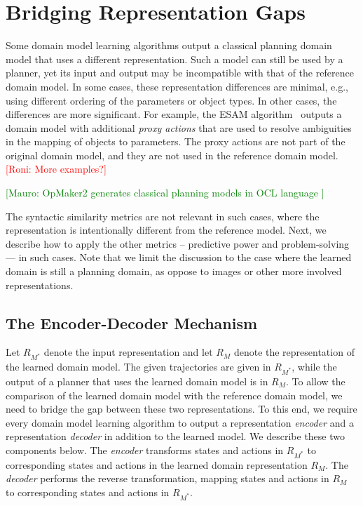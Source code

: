 \documentclass{article}
\theoremstyle{definition}
\theoremstyle{remark}
\newcommand{\realm}{\ensuremath{M^*}\xspace}
\newcommand{\roni}[1]{{\textcolor{red}{[Roni: #1]}}}
\newcommand{\mauro}[1]{{\textcolor{green}{[Mauro: #1]}}}
\begin{document}
\section{Bridging Representation Gaps}
\label{sec:bridging-gap}
Some domain model learning algorithms output a classical planning domain model that uses a different representation. Such a model can still be used by a planner, yet its input and output may be incompatible with that of the reference domain model. 
In some cases, these representation differences are minimal, e.g., using  different ordering of the parameters or object types. 
In other cases, the differences are more significant. 
For example, the ESAM algorithm~\citep{juba2021safe} outputs a domain model with additional \emph{proxy actions} that are used to resolve ambiguities in the mapping of objects to parameters.
The proxy actions are not part of the original domain model, and they are not used in the reference domain model. 
\roni{More examples?}

\mauro{OpMaker2 generates classical planning models in OCL language \cite{mccluskey2010action}}

The syntactic similarity metrics are not relevant in such cases, where the representation is intentionally different from the reference model. Next, we describe how to apply the other metrics -- predictive power and problem-solving --- in such cases. 
Note that we limit the discussion to the case where the learned domain is still a planning domain, as oppose to images or other more involved representations. 

\subsection{The Encoder-Decoder Mechanism}
Let $R_{\realm}$ denote the input representation and let $R_M$ denote the representation of the learned domain model. 
The given trajectories are given in $R_{\realm}$, 
while the output of a planner that uses the learned domain model is in $R_M$. 
To allow the comparison of the learned domain model with the reference domain model, we need to bridge the gap between these two representations. 
To this end, we require every domain model learning algorithm to output 
a representation \emph{encoder} and a representation \emph{decoder} in addition to the learned model. We describe these two components below.  
The \emph{encoder} transforms states and actions in $R_{\realm}$ to corresponding states and actions in the learned domain representation $R_M$. 
The \emph{decoder} performs the reverse transformation, mapping states and actions in $R_M$ to corresponding states and actions in $R_\realm$.
\end{document}
